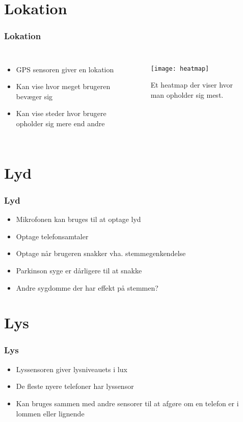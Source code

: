 \section{Lokation}
\begin{frame}[fragile]
\frametitle{Lokation}
\begin{columns}
\column[t]{5cm}
\begin{itemize}
\item GPS sensoren giver en lokation
\item Kan vise hvor meget brugeren bevæger sig
\item Kan vise steder hvor brugere opholder sig mere end andre
\end{itemize}
\column[t]{5cm}
\begin{figure}
\texttt{[image: heatmap]}
\caption{Et heatmap der viser hvor man opholder sig mest.}
\end{figure}
\end{columns}
\end{frame}



\section{Lyd}
\begin{frame}
\frametitle{Lyd}
\begin{itemize}
\item Mikrofonen kan bruges til at optage lyd
\item Optage telefonsamtaler
\item Optage når brugeren snakker vha. stemmegenkendelse
\item Parkinson syge er dårligere til at snakke
\item Andre sygdomme der har effekt på stemmen?
\end{itemize}
\end{frame}



\section{Lys}
\begin{frame}
\frametitle{Lys}
\begin{itemize}
\item Lyssensoren giver lysniveauets i lux
\item De fleste nyere telefoner har lyssensor
\item Kan bruges sammen med andre sensorer til at afgøre om en telefon er i lommen eller lignende
\end{itemize}
\end{frame}



